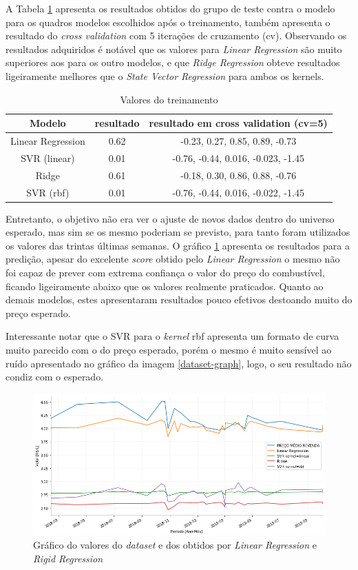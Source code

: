 A Tabela \ref{results} apresenta os resultados  obtidos do grupo de teste contra o modelo para os quadros modelos
escolhidos após o treinamento, também apresenta o resultado do \textit{cross validation} com 5 iterações de cruzamento (cv).
Observando os resultados adquiridos é notável que os valores para \textit{Linear Regression}  são muito superiores aos para os outro modelos, e que \textit{Ridge Regression} obteve resultados ligeiramente  melhores que o \textit{State Vector Regression} para ambos os kernels.

\begin{table}[!ht]
\centering
    \caption{Valores do treinamento}
    \label{results}
\begin{tabular}{c c c}
    Modelo & resultado & resultado em cross validation (cv=5) \\
    \hline
    Linear Regression & 0.62 & -0.23,  0.27,  0.85,  0.89,  -0.73 \\
    SVR (linear) & 0.01 & -0.76, -0.44,  0.016, -0.023, -1.45 \\
    Ridge & 0.61 & -0.18,  0.30, 0.86,  0.88, -0.76 \\
    SVR (rbf) & 0.01 & -0.76, -0.44,  0.016, -0.022, -1.45
\end{tabular}   
\end{table}

Entretanto, o objetivo não era ver o ajuste de novos dados dentro do universo esperado, mas sim se os mesmo poderiam se previsto, para tanto foram utilizados os valores das trintas últimas semanas. O gráfico \ref{predict} apresenta os resultados para a predição, apesar do excelente \textit{score} obtido pelo  \textit{Linear Regression} o mesmo não foi capaz de prever com extrema confiança o valor do preço do combustível, ficando ligeiramente abaixo que os valores realmente praticados. Quanto ao demais modelos, estes apresentaram resultados pouco efetivos destoando muito do preço esperado.

Interessante notar que o SVR para o \textit{kernel} rbf apresenta um formato de curva muito parecido com o do preço esperado, porém o mesmo é muito sensível ao ruído apresentado no gráfico da imagem \ref{dataset-graph}, logo, o seu resultado não condiz com o esperado.


\begin{figure}[!ht]
\centering
\caption{Gráfico do valores do \textit{dataset} e dos obtidos por \textit{Linear Regression} e \textit{Rigid Regression}}
\label{predict}
\includegraphics[width=1 \textwidth]{Figuras/predict.png}
\end{figure}